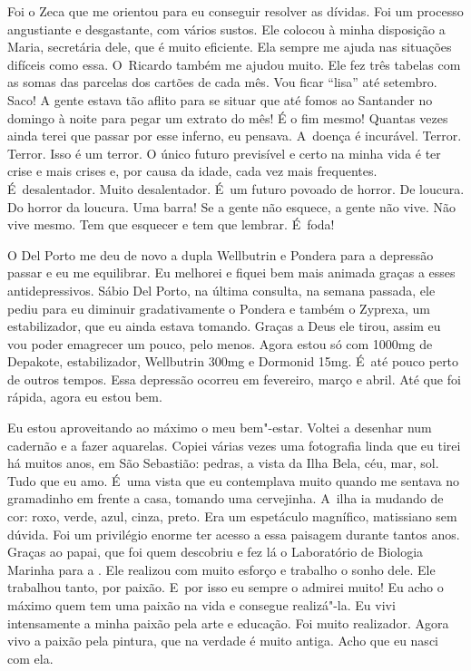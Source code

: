 Foi o Zeca que me orientou para eu conseguir resolver as dívidas. Foi um
processo angustiante e desgastante, com vários sustos. Ele colocou à
minha disposição a Maria, secretária dele, que é muito eficiente. Ela
sempre me ajuda nas situações difíceis como essa. O~Ricardo também me
ajudou muito. Ele fez três tabelas com as somas das parcelas dos cartões
de cada mês. Vou ficar ``lisa'' até setembro. Saco! A gente estava tão
aflito para se situar que até fomos ao Santander no domingo à noite para
pegar um extrato do mês! É o fim mesmo! Quantas vezes ainda terei que
passar por esse inferno, eu pensava. A~doença é incurável. Terror.
Terror. Isso é um terror. O único futuro previsível e certo na minha
vida é ter crise e mais crises e, por causa da idade, cada vez mais
frequentes. É~desalentador. Muito desalentador. É~um futuro povoado de
horror. De loucura. Do horror da loucura. Uma barra! Se a gente não
esquece, a gente não vive. Não vive mesmo. Tem que esquecer e tem que
lembrar. É~foda!

O Del Porto me deu de novo a dupla Wellbutrin e Pondera para a depressão
passar e eu me equilibrar. Eu melhorei e fiquei bem mais animada graças
a esses antidepressivos. Sábio Del Porto, na última consulta, na semana
passada, ele pediu para eu diminuir gradativamente o Pondera e também o
Zyprexa, um estabilizador, que eu ainda estava tomando. Graças a Deus
ele tirou, assim eu vou poder emagrecer um pouco, pelo menos. Agora
estou só com 1000mg de Depakote, estabilizador, Wellbutrin 300mg e
Dormonid 15mg. É~até pouco perto de outros tempos. Essa depressão
ocorreu em fevereiro, março e abril. Até que foi rápida, agora eu estou
bem.

Eu estou aproveitando ao máximo o meu bem"-estar. Voltei a desenhar num
cadernão e a fazer aquarelas. Copiei várias vezes uma fotografia linda
que eu tirei há muitos anos, em São Sebastião: pedras, a vista da Ilha
Bela, céu, mar, sol. Tudo que eu amo. É~uma vista que eu contemplava
muito quando me sentava no gramadinho em frente a casa, tomando uma
cervejinha. A~ilha ia mudando de cor: roxo, verde, azul, cinza, preto.
Era um espetáculo magnífico, matissiano sem dúvida. Foi um privilégio
enorme ter acesso a essa paisagem durante tantos anos. Graças ao papai,
que foi quem descobriu e fez lá o Laboratório de Biologia Marinha para a
. Ele realizou com muito esforço e trabalho o sonho dele. Ele
trabalhou tanto, por paixão. E~por isso eu sempre o admirei muito! Eu
acho o máximo quem tem uma paixão na vida e consegue realizá"-la. Eu vivi
intensamente a minha paixão pela arte e educação. Foi muito realizador.
Agora vivo a paixão pela pintura, que na verdade é muito antiga. Acho
que eu nasci com ela.


